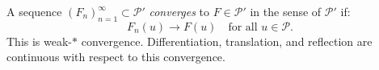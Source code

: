 A sequence $(F_n)_{n=1}^{\infty} \subset \mathcal{P}'$ \textit{converges} to $F \in \mathcal{P}'$ in the sense of $\mathcal{P}'$ if:
\[
F_n(u) \to F(u) \quad \text{for all } u \in \mathcal{P}.
\]
This is weak-$*$ convergence. Differentiation, translation, and reflection are continuous with respect to this convergence.
